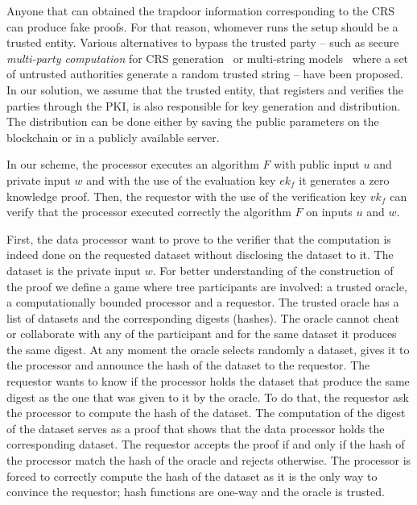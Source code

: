 Anyone that can obtained the trapdoor information corresponding to the CRS can produce fake proofs. For that reason, whomever runs the setup should be a trusted entity. Various alternatives to bypass the trusted party -- such as secure \textit{multi-party computation} for CRS generation~\cite{zcash_mpc} or multi-string models~\cite{groth2014cryptography} where a set of untrusted authorities generate a random trusted string -- have been proposed. In our solution, we assume that the trusted entity, that registers and verifies the parties through the PKI, is also responsible for key generation and distribution. The distribution can be done either by saving the public parameters on the blockchain or in a publicly available server.

In our scheme, the processor executes an algorithm $F$ with public input $u$ and private input $w$ and with the use of the evaluation key $ek_f$ it generates a zero knowledge proof. Then, the requestor with the use of the verification key $vk_f$ can verify that the processor executed correctly the algorithm $F$ on inputs $u$ and $w$.

First, the data processor want to prove to the verifier that the computation is indeed done on the requested dataset without disclosing the dataset to it. The dataset is the private input $w$. For better understanding of the construction of the proof we define a game where tree participants are involved: a trusted oracle, a  computationally bounded processor and a requestor. The trusted oracle has a list of datasets and the corresponding digests (hashes). The oracle cannot cheat or collaborate with any of the participant and for the same dataset it produces the same digest. At any moment the oracle selects randomly a dataset, gives it to the processor and announce the hash of the dataset to the requestor. The requestor wants to know if the processor holds the dataset that produce the same digest as the one that was given to it by the oracle. To do that, the requestor ask the processor to compute the hash of the dataset. The computation of the digest of the dataset serves as a proof that shows that the data processor holds the corresponding dataset. The requestor accepts the proof if and only if the hash of the processor match the hash of the oracle and rejects otherwise. The processor is forced to correctly compute the hash of the dataset as it is the only way to convince the requestor; hash functions are one-way and the oracle is trusted.

